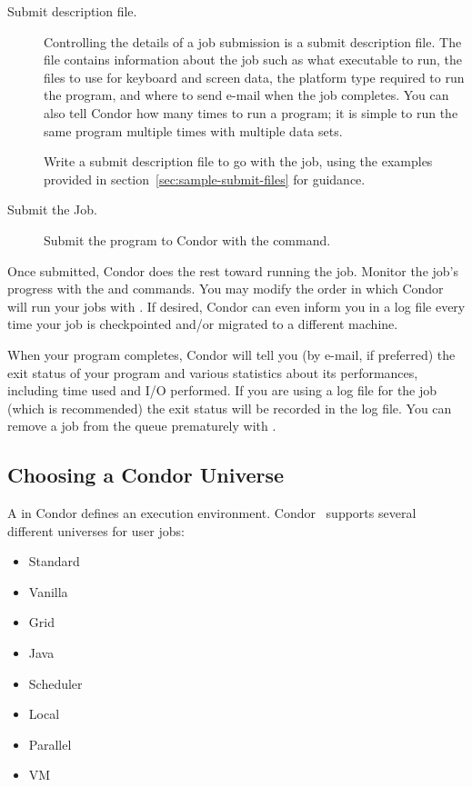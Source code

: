 \begin{description}
\item[Submit description file.]
Controlling the details of a job submission is a
submit description file.
The file contains information
about the job such as what executable to run, the
files to use for keyboard and screen data,
the platform type required to run the program, and
where to send e-mail when the job completes.
You can also tell Condor how many times to run a program;
it is simple to run the same program
multiple times with multiple data sets.

Write a submit description file to go with the job, using
the examples provided in section~\ref{sec:sample-submit-files}
for guidance.

\item[Submit the Job.]Submit the program to Condor with
the  command.

\end{description}

Once submitted, Condor does the rest toward running
the job.
Monitor the job's progress with the 
and  commands.
You may modify the order in which Condor will run your jobs with
. If desired, Condor can even inform you in a log file 
every time your job is checkpointed and/or migrated to a different machine. 

When your program completes, Condor will tell you
(by e-mail, if preferred) the exit status of your program and various
statistics about its performances, including time used and I/O performed.
If you are using a log file for the job (which is recommended) the exit
status will be recorded in the log file.
You can remove a job from the
queue prematurely with . 


\subsection{\label{sec:Choosing-Universe}
Choosing a Condor Universe}

A  in Condor
defines an execution environment. 
Condor \VersionNotice\ supports several different
universes for user jobs:
\begin{itemize}
	\item Standard
	\item Vanilla
	\item Grid
	\item Java
	\item Scheduler
	\item Local
 	\item Parallel
 	\item VM
\end{itemize}

